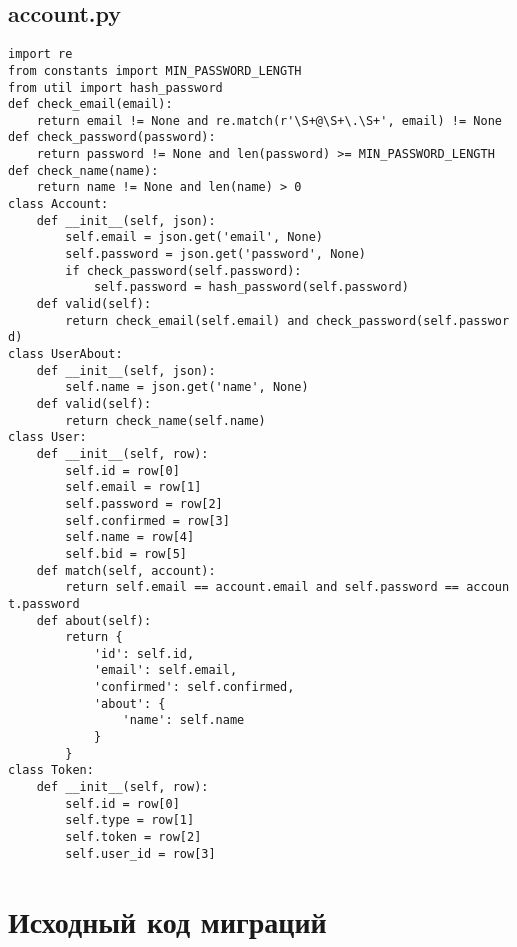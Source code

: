 \documentclass[listing]{espd}
\begin{document}
\subsection{account.py}
\begin{verbatim}
import re
from constants import MIN_PASSWORD_LENGTH
from util import hash_password
def check_email(email):
    return email != None and re.match(r'\S+@\S+\.\S+', email) != None
def check_password(password):
    return password != None and len(password) >= MIN_PASSWORD_LENGTH
def check_name(name):
    return name != None and len(name) > 0
class Account:
    def __init__(self, json):
        self.email = json.get('email', None)
        self.password = json.get('password', None)
        if check_password(self.password):
            self.password = hash_password(self.password)
    def valid(self):
        return check_email(self.email) and check_password(self.passwor
d)
class UserAbout:
    def __init__(self, json):
        self.name = json.get('name', None)
    def valid(self):
        return check_name(self.name)
class User:
    def __init__(self, row):
        self.id = row[0]
        self.email = row[1]
        self.password = row[2]
        self.confirmed = row[3]
        self.name = row[4]
        self.bid = row[5]
    def match(self, account):
        return self.email == account.email and self.password == accoun
t.password
    def about(self):
        return {
            'id': self.id,
            'email': self.email,
            'confirmed': self.confirmed,
            'about': {
                'name': self.name
            }
        }
class Token:
    def __init__(self, row):
        self.id = row[0]
        self.type = row[1]
        self.token = row[2]
        self.user_id = row[3]
\end{verbatim}

\section{Исходный код миграций}
\end{document}
